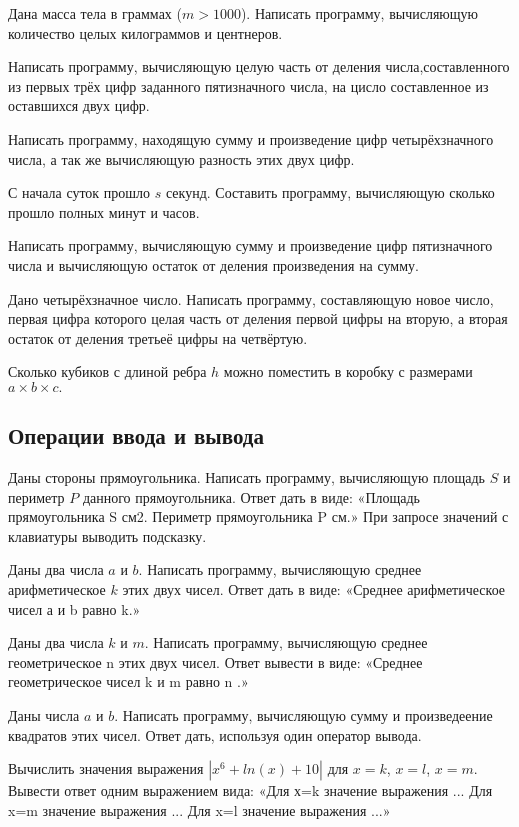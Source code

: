 \task Дана масса тела в граммах ($m>1000$). Написать программу,
вычисляющую количество целых килограммов и центнеров.

\task Написать программу, вычисляющую целую часть от деления
числа,составленного из первых трёх цифр заданного пятизначного числа,
на цисло составленное из оставшихся двух цифр.

\task Написать программу, находящую сумму и произведение цифр
четырёхзначного числа, а так же вычисляющую разность этих двух цифр.

\task С начала суток прошло $s$ секунд. Составить программу, вычисляющую
сколько прошло полных минут и часов.

\task Написать программу, вычисляющую сумму и произведение цифр
пятизначного числа и вычисляющую остаток от деления произведения на
сумму.

\task Дано четырёхзначное число. Написать программу, составляющую
новое число, первая цифра которого целая часть от деления первой цифры
на вторую, а вторая остаток от деления третьеё цифры на четвёртую.

\task Сколько кубиков с длиной ребра $h$ можно поместить в коробку с
размерами $a\times b\times c.$

\subsection{Операции ввода и вывода}

\task Даны стороны прямоугольника. Написать программу, вычисляющую
площадь $S$ и периметр $P$ данного прямоугольника. Ответ дать в виде:
«Площадь прямоугольника S см2. Периметр прямоугольника P см.» При
запросе значений с клавиатуры выводить подсказку.

\task Даны два числа $a$ и $b$. Написать программу, вычисляющую среднее
арифметическое $k$ этих двух чисел. Ответ дать в виде: «Среднее
арифметическое чисел а и b равно k.»

\task Даны два числа $k$ и $m$. Написать программу, вычисляющую среднее
геометрическое n этих двух чисел. Ответ вывести в виде: «Среднее
геометрическое чисел k и m равно n .»

\task Даны числа $a$ и $b$. Написать программу, вычисляющую сумму и
произведеение квадратов этих чисел. Ответ дать, используя один
оператор вывода.

\task Вычислить значения выражения $|x^6+ln(x)+10|$ для $x=k$, $x=l$,
$x=m$. Вывести ответ одним выражением вида: «Для х=k значение выражения
... Для x=m значение выражения ... Для x=l значение выражения ...»

